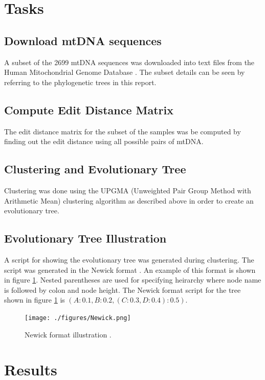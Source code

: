 \documentclass[conference]{IEEEtran}
\begin{document}
\section{Tasks}

\subsection{Download mtDNA sequences}
A subset of the 2699 mtDNA sequences was downloaded into text files from the Human Mitochondrial Genome Database \cite{mtDnaDatabase}. The subset details can be seen by referring to the phylogenetic trees in this report.

\subsection{Compute Edit Distance Matrix}

The edit distance matrix for the subset of the samples was be computed by finding out the edit distance using all possible pairs of mtDNA. 

\subsection{Clustering and Evolutionary Tree}
Clustering was done using the UPGMA (Unweighted Pair Group Method with Arithmetic Mean) clustering algorithm as described above in order to create an evolutionary tree.

\subsection{Evolutionary Tree Illustration}
A script for showing the evolutionary tree was generated during clustering. The script was generated in the Newick format \cite{Newick}. An example of this format is shown in figure \ref{NewickFormat}. Nested parentheses are used for specifying heirarchy where node name is followed by colon and node height. The Newick format script for the tree shown in figure \ref{NewickFormat} is $(A:0.1,B:0.2,(C:0.3,D:0.4):0.5)$.


\begin{figure}[!t]
\centering
\texttt{[image: ./figures/Newick.png]}
\caption{Newick format illustration \cite{Newick} .}
\label{NewickFormat}
\end{figure}

\FloatBarrier
\section{Results}
\end{document}
